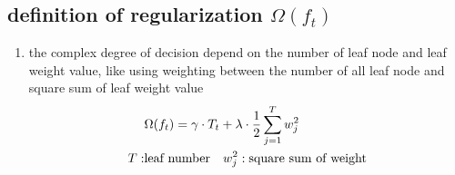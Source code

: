 \documentclass[12pt]{ctexart}%
\begin{document}
		\subsection{\quad definition of regularization $\Omega(f_t)$}
			\begin{enumerate}
				\item the complex degree of decision depend on the number of leaf node and leaf weight value, like using weighting between the number of all leaf node and square sum of leaf weight value
					\begin{align}
						&\Omega(f_t) = \gamma \cdot T_t + \lambda \cdot \frac{1}{2}\sum_{j=1}^{T} w_j^2\\
						T: &\text{leaf number} \quad w_j^2: \text{square sum of weight} \notag
					\end{align}
			\end{enumerate}
			
\end{document}
